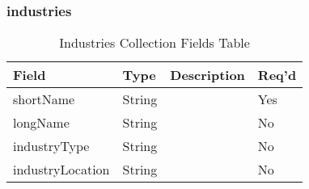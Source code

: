 \subsubsection{industries}
\begin{table}[H]
    \begin{tabular}{|L{3cm}|L{1.7cm}|L{8.8cm}|L{1.3cm}|}
    \hline
        \textbf{Field} & \textbf{Type} & \textbf{Description} & \textbf{Req'd} \\ \hline
        shortName & String &  & Yes \\ \hline
        longName & String & & No\\ \hline
        industryType & String & & No \\ \hline
        industryLocation &  String & & No \\ \hline
    \end{tabular}
    \caption{\label{industry-table}Industries Collection Fields Table}
    \end{table}
